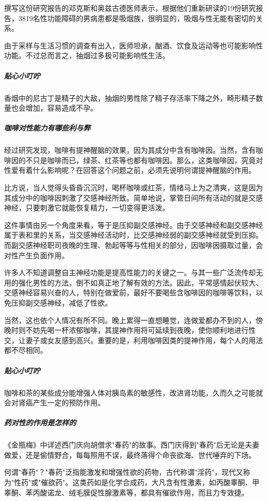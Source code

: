 撰写这份研究报告的邓克斯和奥兹古德医师表示，根据他们重新研读的19份研究报告，3819名性功能障碍的男病患都是吸烟族，很明显的，吸烟与性无能有密切的关系。

由于采样与生活习惯的调查有出入，医师坦承，酗酒、饮食及运动等也可能影响性功能。不过总而言之，抽烟过多极可能影响性生活。

\subparagraph{贴心小叮咛}

香烟中的尼古丁是精子的大敌，抽烟的男性除了精子存活率下降之外，畸形精子数量也会增加，容易造成不孕。

\subparagraph{咖啡对性能力有哪些利与弊}

经过研究发现，咖啡有提神醒脑的效果，因为其成分中含有咖啡因。当然，含有咖啡因的不只是咖啡而已，绿茶、红茶等也都有咖啡因。那么，这类咖啡因，究竟对性爱有着什么影响呢？在回答这个问题之前，必须先说明何谓提神醒脑的作用。

比方说，当人觉得头昏昏沉沉时，喝杯咖啡或红茶，情绪马上为之清爽，这是因为其成分中的咖啡因刺激了交感神经所致。简单地说，掌管日间所有活动的就是交感神经，只要刺激它就能恢复精力，一切变得更活泼。

这件事情由另一个角度来看，等于是压抑副交感神经。由于交感神经和副交感神经属于表和里的关系，当交感神经活动时，比交感神经弱的副交感神经就受到压抑。而副交感神经职司夜晚的生理、勃起等等与性相关的部分，因咖啡因摄取过量，会对性产生负面作用。

许多人不知道调整自主神经功能是提高性能力的关键之一。与其一些广泛流传却无用的强化男性的方法，倒不如真正地了解有效的方法。因此，平常感情起伏较大、交感神经容易兴奋的人，特别在做爱前，最好不要喝些含咖啡因的咖啡等饮料，以免压抑副交感神经，减低了性欲。

当然，这也依个人情况有所不同。晚上累得一直想睡觉，连做爱都办不到的人，傍晚时则不妨先喝一杯浓郁咖啡，其提神作用将可延续到夜晚，使你顺利地进行性交，让妻子或女友感到高兴。重要的是，利用咖啡因类的提神作用，每个人的用法都不尽相同。

\subparagraph{贴心小叮咛}

咖啡和茶的某些成分能增强人体对胰岛素的敏感性，改进肾功能，久而久之可能就会对肾癌产生一定的预防作用。

\subparagraph{药对性的作用是怎样的}

《金瓶梅》中详述西门庆向胡僧求"春药"的故事。西门庆得到"春药"后无论是夫妻做爱，还是偷情野合，每每照用不误，最终落得个命丧欲海、世代唾弃的下场。

何谓"春药"？"春药"泛指能激发和增强性欲的药物，古代称谓"淫药"，现代又称为"性药"或"催欲药"。这类药如是化学合成药，大凡含有性激素，如丙酸睾酮、甲睾酮、苯丙酸诺龙、绒毛膜促性腺激素等，都具有催欲作用，而且力专效捷。

